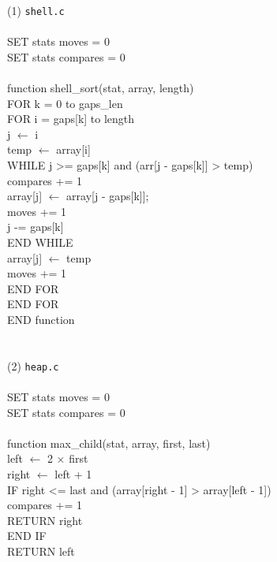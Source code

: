 \documentclass[12pt]{article}
\begin{document}
(1) \texttt{shell.c} \\
\\
SET stats moves = 0 \\
SET stats compares = 0 \\
\\
function shell\_sort(stat, array, length) \\
\indent FOR k = 0 to gaps\_len \\
\indent \indent FOR i = gaps[k] to length \\
\indent \indent \indent j $\leftarrow$ i \\
\indent \indent \indent temp $\leftarrow$ array[i] \\
\indent \indent \indent WHILE j >= gaps[k] and (arr[j - gaps[k]] > temp) \\
\indent \indent \indent \indent compares += 1 \\
\indent \indent \indent \indent array[j] $\leftarrow$ array[j - gaps[k]]; \\
\indent \indent \indent \indent moves += 1 \\
\indent \indent \indent \indent j -= gaps[k] \\
\indent \indent \indent END WHILE \\
\indent \indent \indent array[j] $\leftarrow$ temp \\
\indent \indent \indent moves += 1 \\
\indent \indent END FOR \\
\indent END FOR \\
END function \\
\\
\\
(2) \texttt{heap.c} \\
\\
SET stats moves = 0 \\
SET stats compares = 0 \\
\\
function max\_child(stat, array, first, last) \\
\indent left $\leftarrow$ 2 $\times$ first \\
\indent right $\leftarrow$ left + 1 \\
\indent IF right <= last and (array[right - 1] > array[left - 1]) \\
\indent \indent compares += 1 \\
\indent \indent RETURN right \\
\indent END IF \\
\indent RETURN left \\
\end{document}
